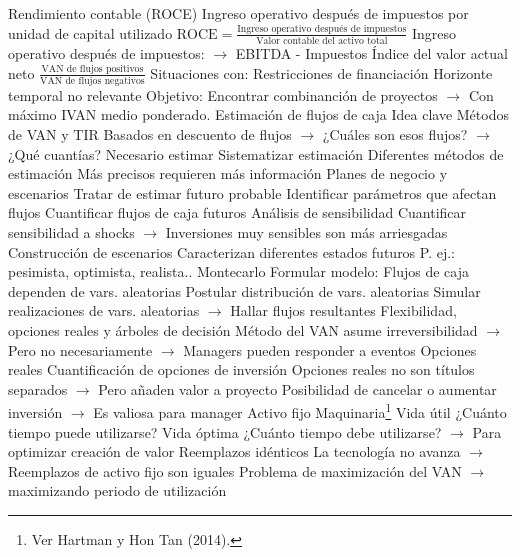 \documentclass{nuevotema}
\begin{document}
\begin{esquemal}
			\3 Rendimiento contable (ROCE)
				\4 Ingreso operativo después de impuestos
				\4[] por unidad de capital utilizado
				\4 $\text{ROCE} = \frac{\text{Ingreso operativo después de impuestos}}{\text{Valor contable del activo total}}$
				\4[] Ingreso operativo después de impuestos:
				\4[] $\to$ EBITDA - Impuestos
			\3 Índice del valor actual neto
				\4 $\frac{\text{VAN de flujos positivos}}{\text{VAN de flujos negativos}}$
				\4 Situaciones con:
				\4[] Restricciones de financiación
				\4[] Horizonte temporal no relevante
				\4 Objetivo:
				\4[] Encontrar combinanción de proyectos
				\4[] $\to$ Con máximo IVAN medio ponderado.
		\2 Estimación de flujos de caja
			\3 Idea clave
				\4 Métodos de VAN y TIR
				\4[] Basados en descuento de flujos
				\4[] $\to$ ¿Cuáles son esos flujos?
				\4[] $\to$ ¿Qué cuantías?
				\4 Necesario estimar
				\4 Sistematizar estimación
				\4[] Diferentes métodos de estimación
				\4[] Más precisos requieren más información
			\3 Planes de negocio y escenarios
				\4 Tratar de estimar futuro probable
				\4[$\to$] Identificar parámetros que afectan flujos
				\4[$\to$] Cuantificar flujos de caja futuros
				\4 Análisis de sensibilidad
				\4[] Cuantificar sensibilidad a shocks
				\4[] $\to$ Inversiones muy sensibles son más arriesgadas
				\4 Construcción de escenarios
				\4[] Caracterizan diferentes estados futuros
				\4[] P. ej.: pesimista, optimista, realista..
			\3 Montecarlo
				\4 Formular modelo:
				\4[] Flujos de caja dependen de vars. aleatorias
				\4 Postular distribución de vars. aleatorias
				\4 Simular realizaciones de vars. aleatorias
				\4[] $\to$ Hallar flujos resultantes
			\3 Flexibilidad, opciones reales y árboles de decisión
				\4 Método del VAN asume irreversibilidad
				\4[] $\to$ Pero no necesariamente
				\4[] $\to$ Managers pueden responder a eventos
				\4 Opciones reales
				\4[] Cuantificación de opciones de inversión
				\4[] Opciones reales no son títulos separados
				\4[] $\to$ Pero añaden valor a proyecto
				\4[] Posibilidad de cancelar o aumentar inversión
				\4[] $\to$ Es valiosa para manager
	\1 
		\2 Activo fijo
			\3 Maquinaria\footnote{Ver Hartman y Hon Tan (2014).}
				\4 Vida útil
				\4[] ¿Cuánto tiempo puede utilizarse?
				\4 Vida óptima
				\4[] ¿Cuánto tiempo debe utilizarse?
				\4[] $\to$ Para optimizar creación de valor
				\4 Reemplazos idénticos
				\4[] La tecnología no avanza
				\4[] $\to$ Reemplazos de activo fijo son iguales
				\4[] Problema de maximización del VAN
				\4[] $\to$ maximizando periodo de utilización

\end{esquemal}
\end{document}
